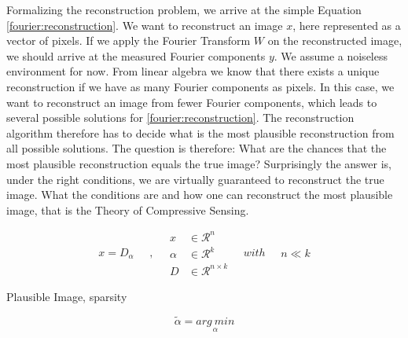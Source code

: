 Formalizing the reconstruction problem, we arrive at the simple Equation \eqref{fourier:reconstruction}. We want to reconstruct an image $x$, here represented as a vector of pixels. If we apply the Fourier Transform $W$ on the reconstructed image, we should arrive at the measured Fourier components $y$. We assume a noiseless environment for now. From linear algebra we know that there  exists a unique reconstruction if we have as many Fourier components as pixels. In this case, we want to reconstruct an image from fewer Fourier components, which leads to several possible solutions for \eqref{fourier:reconstruction}. The reconstruction algorithm therefore has to decide what is the most plausible reconstruction from all possible solutions. The question is therefore: What are the chances that the most plausible reconstruction equals the true image? Surprisingly the answer is, under the right conditions, we are virtually guaranteed to reconstruct the true image. What the conditions are and how one can reconstruct the most plausible image, that is the Theory of Compressive Sensing.

\begin{equation}\label{cs:sparseland}
\begin{split}
x  =  D_{\alpha}
\end{split}
\quad , \quad
\begin{split}
x &\in \mathcal{R}^n\\
\alpha &\in \mathcal{R}^k\\
D &\in \mathcal{R}^{n \times k}
\end{split}
\quad with \quad
\begin{split}
n \ll k
\end{split}
\end{equation}

Plausible Image, sparsity

\begin{equation}\label{cs:noiseless}
\tilde{\alpha} =  \underset{\alpha}{arg\: min}
\end{equation}

